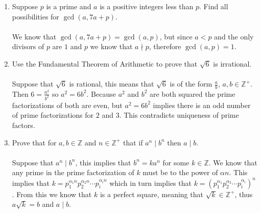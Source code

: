 \documentclass[class=article, crop=false]{standalone}
\def\integers{{\mathbb Z}}
\begin{document}
\begin{enumerate}[1.]
	\item Suppose $p$ is a prime and $a$ is a positive integers less than $p$. Find all possibilities for
	$\gcd(a,7a+p)$.\\\\
	We know that $\gcd(a,7a+p)=\gcd(a,p)$, but since $a<p$ and the only divisors of $p$ are $1$ and
	$p$ we know that $a\nmid p$, therefore $\gcd(a,p)=1$.

	\item Use the Fundamental Theorem of Arithmetic to prove that $\sqrt{6}$ is irrational.\\\\
	Suppose that $\sqrt{6}$ is rational, this means that $\sqrt{6}$ is of the form $\frac{a}{b}$, $a,b\in\integers^+$.
	Then $6=\frac{a^2}{b^2}$ so $a^2=6b^2$. Because $a^2$ and $b^2$ are both squared the prime factorizations
	of both are even, but $a^2=6b^2$ implies there is an odd number of prime factorizations for $2$ and $3$. This contradicts
	uniqueness of prime factors.
	
	\item Prove that for $a,b\in\integers$ and $n\in\integers^+$ that if $a^n\mid b^n$ then $a\mid b$.\\\\
	Suppose that $a^n\mid b^n$, this implies that $b^n = ka^n$ for some $k\in\integers$.
	We know that any prime in the prime factorization of $k$ must be to the power of $\alpha n$.
	This implies that $k=p_1^{\alpha_1 n} p_2^{\alpha_2 n} \cdots p_i^{\alpha_i n}$ which in turn
	implies that $k=(p_1^{\alpha_1} p_2^{\alpha_2}\cdots p_i^{\alpha_i})^n$. From this we know that 
	$k$ is a perfect square, meaning that $\sqrt{k}\in\integers^+$, thus $a\sqrt{k}=b$ and
	$a\mid b$.
	
\end{enumerate}
\end{document}
